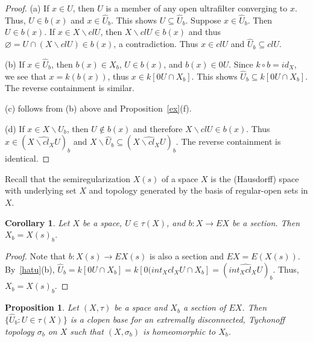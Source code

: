\documentclass[11pt]{amsart}
\newif\ifdraft\draftfalse
\newtheorem{corollary}[theorem]{Corollary}
\newtheorem{proposition}[theorem]{Proposition}
\theoremstyle{definition}
\theoremstyle{remark}
\numberwithin{equation}{section}
\begin{document}
\begin{proof}
(a) If $x\in U$, then $U$ is a member of any open ultrafilter converging to $x$. Thus, $U\in b(x)$ and $x\in\widehat{U}_b$. This shows $U{\subseteq}\widehat{U}_b$. Suppose $x\in\widehat{U}_b$. Then $U\in b(x)$. If $x\in X{\backslash} clU$, then $X{\backslash} clU\in b(x)$ and thus ${\varnothing}=U{\cap} (X{\backslash} clU)\in b(x)$, a contradiction. Thus $x\in clU$ and $\widehat{U}_b{\subseteq} clU$.

(b) If $x\in\widehat{U}_b$, then $b(x)\in X_b$, $U\in b(x)$, and $b(x)\in 0U$. Since $k\circ b=id_X$, we see that $x=k(b(x))$, thus $x\in k[0U \cap X_b]$. This shows $\widehat{U}_b{\subseteq} k[0U \cap X_b]$. The reverse containment is similar.

(c) follows from (b) above and Proposition~\ref{ex}(f).

(d) If $x\in X\backslash \widehat{U} _b$, then $U\notin b(x)$ and therefore $X{\backslash} clU\in b(x)$. Thus $x\in(\widehat{X\backslash cl_XU})_b$ and $X\backslash \widehat{U} _b{\subseteq} (\widehat{X\backslash cl_XU})_b$. The reverse containment is identical.
\end{proof}
Recall that the semiregularization $X(s)$ of a space $X$ is the (Hausdorff) space with underlying set $X$ and topology generated by the basis of regular-open sets in $X$. 
\begin{corollary}
Let $X$ be a space, $U\in\tau(X)$, and $b:X\to EX$ be a section. Then $X_b=X(s)_b$.
\end{corollary}

\begin{proof}
Note that $b:X(s)\to EX(s)$ is also a section and $EX=E(X(s))$. By~\ref{hatu}(b), $\widehat{U}_b=k[0U{\cap} X_b]=k[0(int_Xcl_XU{\cap} X_b]=(\widehat{int_Xcl_XU})_b$. Thus, $X_b=X(s)_b$.
\end{proof}

\begin{proposition}{{\immediate{}}{\ifdraft\hspace{-\lastskip}\vadjust{\vspace{-1mm}\smash{\llap{{\tt {{sectionTop}}}\hspace{8mm}}}\vspace{1mm}}\fi}}
Let $(X,\tau)$ be a space and $X_b$ a section of $EX$. Then $\{\widehat{U}_b: U \in \tau(X)\}$ is a clopen base for an extremally disconnected, Tychonoff topology $\sigma_b$ on $X$ such that $(X,\sigma_b)$ is homeomorphic to $X_b$.
\end{proposition}
\end{document}
